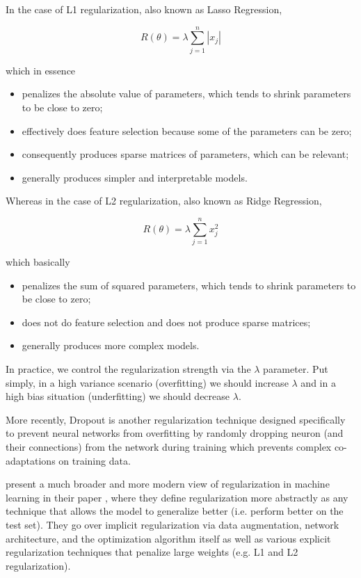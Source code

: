 In the case of L1 regularization, also known as Lasso Regression,

$$
R(\theta) = \lambda \sum_{j=1}^{n} |x_j|
$$

which in essence

\begin{itemize}
    \item penalizes the absolute value of parameters, which tends to shrink parameters to be close to zero;
    \item effectively does feature selection because some of the parameters can be zero;
    \item consequently produces sparse matrices of parameters, which can be relevant;
    \item generally produces simpler and interpretable models.
\end{itemize}

Whereas in the case of L2 regularization, also known as Ridge Regression,

$$
R(\theta) = \lambda \sum_{j=1}^{n} x_j^2
$$

which basically

\begin{itemize}
    \item penalizes the sum of squared parameters, which tends to shrink parameters to be close to zero;
    \item does not do feature selection and does not produce sparse matrices;
    \item generally produces more complex models.
\end{itemize}

In practice, we control the regularization strength via the $\lambda$ parameter. Put simply, in a high variance scenario (overfitting) we should increase $\lambda$ and in a high bias situation (underfitting) we should decrease $\lambda$.

More recently, Dropout \cite{dropout} is another regularization technique designed specifically to prevent neural networks from overfitting by randomly dropping neuron (and their connections) from the network during training which prevents complex co-adaptations on training data.

\citeauthor{regularizationsurvey} present a much broader and more modern view of regularization in machine learning in their \citeyear{regularizationsurvey} paper \cite{regularizationsurvey}, where they define regularization more abstractly as any technique that allows the model to generalize better (i.e. perform better on the test set). They go over implicit regularization via data augmentation, network architecture, and the optimization algorithm itself as well as various explicit regularization techniques that penalize large weights (e.g. L1 and L2 regularization).

